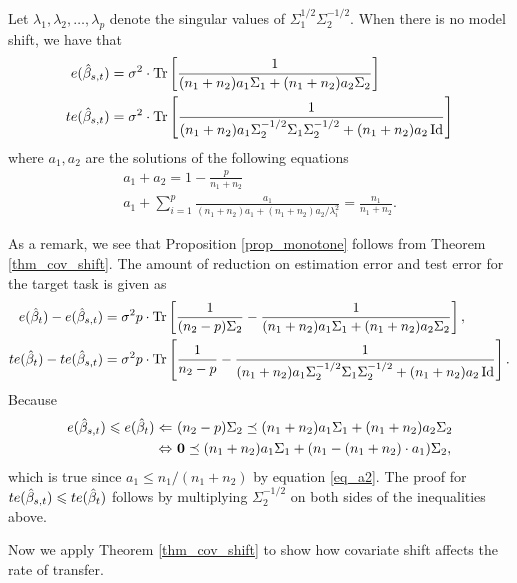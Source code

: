 \begin{theorem}\label{thm_cov_shift}
	Let $\lambda_1, \lambda_2, \dots, \lambda_p$ denote the singular values of $\Sigma_1^{1/2}\Sigma_2^{-1/2}$.
	When there is no model shift, we have that
	\begin{align*}
		e(\hat{\beta}_{s,t}) &= \sigma^2 \cdot \operatorname{Tr}\left[\frac 1 {(n_1 + n_2)a_1\Sigma_1 + (n_1 + n_2)a_2\Sigma_2}\right] \\
		te(\hat{\beta}_{s,t}) &= \sigma^2 \cdot \operatorname{Tr}\left[\frac 1 {(n_1 + n_2)a_1\Sigma_2^{-1/2}\Sigma_1\Sigma_2^{-1/2} + (n_1 + n_2)a_2\operatorname{Id}}\right]
	\end{align*}
	where $a_1, a_2$ are the solutions of the following equations
	\begin{gather}
		 a_1 + a_2 = 1- \frac{p}{n_1 + n_2} \label{eq_a1}\\
		 a_1 + \sum_{i=1}^p \frac{a_1}{(n_1 + n_2)a_1 + (n_1 + n_2) a_2/ \lambda_i^2} = \frac{n_1}{n_1 + n_2}. \label{eq_a2}
	\end{gather}
\end{theorem}

As a remark, we see that Proposition \ref{prop_monotone} follows from Theorem \ref{thm_cov_shift}.
The amount of reduction on estimation error and test error for the target task is given as
	\begin{align*}
		e(\hat{\beta}_t) - e(\hat{\beta}_{s,t})
		&= \sigma^2 p \cdot \operatorname{Tr}\left[\frac 1 {(n_2 - p) \Sigma_2} - \frac 1 {(n_1 + n_2)a_1 \Sigma_1 + (n_1 + n_2)a_2 \Sigma_2}\right], \\
		te(\hat{\beta}_t) - te(\hat{\beta}_{s,t})
		&= \sigma^2 p \cdot \operatorname{Tr}\left[\frac 1 {n_2 - p} - \frac 1 {(n_1 + n_2)a_1\Sigma_2^{-1/2}\Sigma_1\Sigma_2^{-1/2} + (n_1 + n_2)a_2\operatorname{Id}}\right].
	\end{align*}
Because
\begin{align*}
	e(\hat{\beta}_{s,t}) \leqslant e(\hat{\beta}_t)
	\Leftarrow~ & (n_2 - p)\Sigma_2 \preceq (n_1 + n_2) a_1 \Sigma_1 + (n_1 + n_2)a_2 \Sigma_2 \\
	\Leftrightarrow~ & \mathbf{0} \preceq (n_1 + n_2) a_1 \Sigma_1 + (n_1 - (n_1 + n_2)\cdot a_1) \Sigma_2,
\end{align*}
which is true since $a_1 \le n_1 / (n_1 + n_2)$ by equation \eqref{eq_a2}.
The proof for $te(\hat{\beta}_{s,t}) \leqslant te(\hat{\beta}_t)$ follows by multiplying $\Sigma_2^{-1/2}$ on both sides of the inequalities above.

\medskip
Now we apply Theorem \ref{thm_cov_shift} to show how covariate shift affects the rate of transfer.

